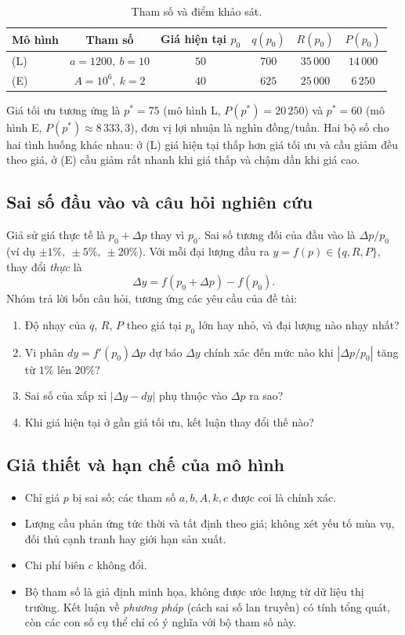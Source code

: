 \begin{table}[h]
\centering
\caption{Tham số và điểm khảo sát.}\label{tab:par}
\begin{tabular}{@{}lccccc@{}}
\toprule
Mô hình & Tham số & Giá hiện tại $p_0$ & $q(p_0)$ & $R(p_0)$ & $P(p_0)$ \\
\midrule
(L) & $a=1200,\ b=10$ & $50$ & $700$ & $35\,000$ & $14\,000$ \\
(E) & $A=10^6,\ k=2$ & $40$ & $625$ & $25\,000$ & $6\,250$ \\
\bottomrule
\end{tabular}
\end{table}

Giá tối ưu tương ứng là $p^*=75$ (mô hình L, $P(p^*)=20\,250$) và $p^*=60$ (mô hình E,
$P(p^*)\approx 8\,333{,}3$), đơn vị lợi nhuận là nghìn đồng/tuần. Hai bộ số cho hai
tình huống khác nhau: ở (L) giá hiện tại thấp hơn giá tối ưu và cầu giảm đều theo giá,
ở (E) cầu giảm rất nhanh khi giá thấp và chậm dần khi giá cao.

\subsection{Sai số đầu vào và câu hỏi nghiên cứu}
Giả sử giá thực tế là $p_0+\Delta p$ thay vì $p_0$. Sai số tương đối của đầu vào là
$\Delta p/p_0$ (ví dụ $\pm 1\%,\ \pm 5\%,\ \pm 20\%$). Với mỗi đại lượng đầu ra
$y=f(p)\in\{q,R,P\}$, thay đổi \emph{thực} là
\begin{equation}
\Delta y = f(p_0+\Delta p) - f(p_0).
\end{equation}
Nhóm trả lời bốn câu hỏi, tương ứng các yêu cầu của đề tài:
\begin{enumerate}
  \item Độ nhạy của $q$, $R$, $P$ theo giá tại $p_0$ lớn hay nhỏ, và đại lượng nào nhạy nhất?
  \item Vi phân $dy=f'(p_0)\Delta p$ dự báo $\Delta y$ chính xác đến mức nào khi
        $|\Delta p/p_0|$ tăng từ $1\%$ lên $20\%$?
  \item Sai số của xấp xỉ $|\Delta y - dy|$ phụ thuộc vào $\Delta p$ ra sao?
  \item Khi giá hiện tại ở gần giá tối ưu, kết luận thay đổi thế nào?
\end{enumerate}

\subsection{Giả thiết và hạn chế của mô hình}
\begin{itemize}
  \item Chỉ giá $p$ bị sai số; các tham số $a,b,A,k,c$ được coi là chính xác.
  \item Lượng cầu phản ứng tức thời và tất định theo giá; không xét yếu tố mùa vụ,
        đối thủ cạnh tranh hay giới hạn sản xuất.
  \item Chi phí biên $c$ không đổi.
  \item Bộ tham số là giả định minh họa, không được ước lượng từ dữ liệu thị trường.
        Kết luận về \emph{phương pháp} (cách sai số lan truyền) có tính tổng quát,
        còn các con số cụ thể chỉ có ý nghĩa với bộ tham số này.
\end{itemize}
